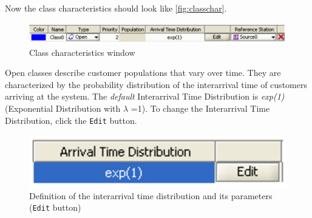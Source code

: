 Now the class characteristics should look like \autoref{fig:classchar}.

\begin{figure}[htb]
    \begin{center}
        \includegraphics[scale=.5]{img/jsimg/3.3.eps}
    \end{center}
    \caption{Class characteristics window}
    \label{fig:classchar}
\end{figure}

Open classes describe customer populations that vary over time.
They are characterized by the probability distribution of the
interarrival time of customers arriving at the system. The
\emph{default} Interarrival Time Distribution is \emph{exp(1)}
(Exponential Distribution with $\lambda$ =1). To change the
Interarrival Time Distribution, click the \texttt{Edit} button.
\begin{figure}[htb]
    \begin{center}
        \includegraphics[scale=.5]{img/jsimg/3.4.eps}
    \end{center}
    \caption{Definition of the interarrival time distribution and its parameters (\texttt{Edit} button)}
    \label{fig:defclasschar}
\end{figure}


